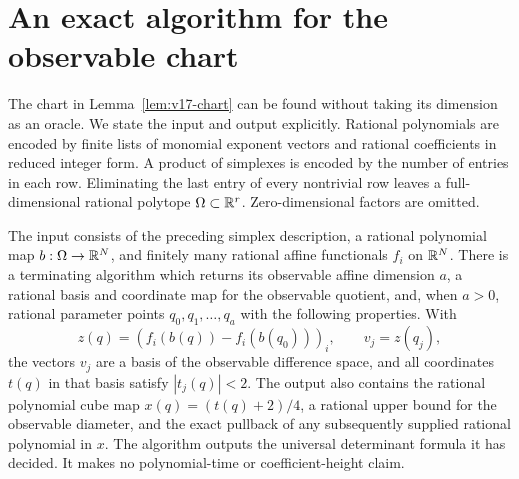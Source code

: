 \section{An exact algorithm for the observable chart}
\label{sec:v18-chart}
The chart in Lemma~\ref{lem:v17-chart} can be found without taking its
dimension as an oracle. We state the input and output explicitly. Rational
polynomials are encoded by finite lists of monomial exponent vectors and
rational coefficients in reduced integer form. A product of simplexes is
encoded by the number of entries in each row. Eliminating the last entry
of every nontrivial row leaves a full-dimensional rational polytope
$\Omega\subset\mathbb R^r$. Zero-dimensional factors are omitted.

\begin{proposition}
\label{prop:v18-chart}
The input consists of the preceding simplex description, a rational
polynomial map $b:\Omega\to\mathbb R^N$, and finitely many rational affine
functionals $f_i$ on $\mathbb R^N$. There is a terminating algorithm which returns
its observable affine dimension $a$, a rational basis and coordinate map
for the observable quotient, and, when $a>0$, rational parameter points
$q_0,q_1,\ldots,q_a$ with the following properties. With
\[
 z(q)=(f_i(b(q))-f_i(b(q_0)))_i,\qquad v_j=z(q_j),
\]
the vectors $v_j$ are a basis of the observable difference space, and
all coordinates $t(q)$ in that basis satisfy $|t_j(q)|<2$. The output also
contains the rational polynomial cube map $x(q)=(t(q)+2)/4$, a rational
upper bound for the observable diameter, and the exact pullback of any
subsequently supplied rational polynomial in $x$.
The algorithm outputs the universal determinant formula it has decided.
It makes no polynomial-time or coefficient-height claim.
\end{proposition}
